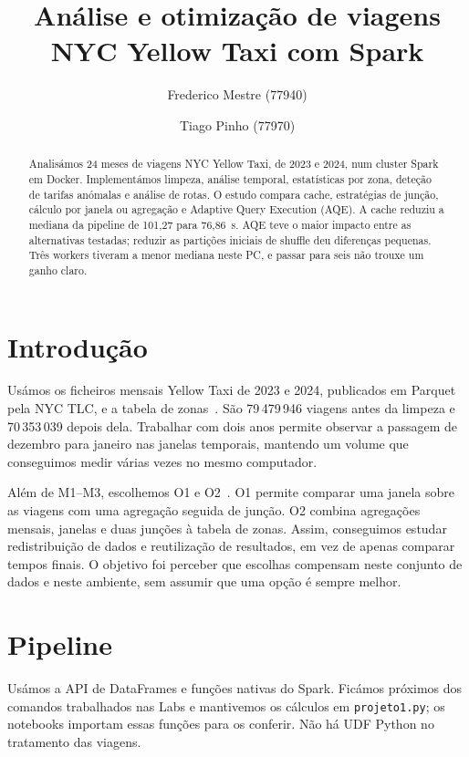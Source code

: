 \documentclass[sigconf]{acmart}
\begin{document}
\title{Análise e otimização de viagens NYC Yellow Taxi com Spark}
\author{Frederico Mestre (77940)}
\author{Tiago Pinho (77970)}
\renewcommand{\shortauthors}{Mestre e Pinho}

\begin{abstract}
Analisámos 24 meses de viagens NYC Yellow Taxi, de 2023 e 2024,
num cluster Spark em Docker. Implementámos limpeza, análise temporal,
estatísticas por zona, deteção de tarifas anómalas e análise de rotas.
O estudo compara cache, estratégias de junção, cálculo por janela ou
agregação e Adaptive Query Execution (AQE). A cache reduziu a mediana
da pipeline de 101,27 para 76,86~s. AQE teve o maior impacto entre as
alternativas testadas; reduzir as partições iniciais de shuffle deu
diferenças pequenas. Três workers tiveram a menor mediana neste PC,
e passar para seis não trouxe um ganho claro.
\end{abstract}
\maketitle

\section{Introdução}
Usámos os ficheiros mensais Yellow Taxi de 2023 e 2024, publicados
em Parquet pela NYC TLC, e a tabela de zonas~\cite{tlc}. São
79\,479\,946 viagens antes da limpeza e 70\,353\,039 depois dela.
Trabalhar com dois anos permite observar a passagem de dezembro
para janeiro nas janelas temporais, mantendo um volume que conseguimos
medir várias vezes no mesmo computador.

Além de M1--M3, escolhemos O1 e O2~\cite{assignment}. O1 permite
comparar uma janela sobre as viagens com uma agregação seguida de
junção. O2 combina agregações mensais, janelas e duas junções à
tabela de zonas. Assim, conseguimos estudar redistribuição de dados
e reutilização de resultados, em vez de apenas comparar tempos finais.
O objetivo foi perceber que escolhas compensam neste conjunto de
dados e neste ambiente, sem assumir que uma opção é sempre melhor.

\section{Pipeline}
Usámos a API de DataFrames e funções nativas do Spark. Ficámos próximos
dos comandos trabalhados nas Labs e mantivemos os cálculos em
\texttt{projeto1.py}; os notebooks importam essas funções para os
conferir. Não há UDF Python no tratamento das viagens.
\end{document}
